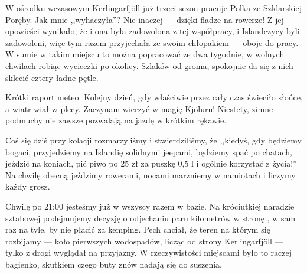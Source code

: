 W ośrodku wczasowym Kerlingarfjöll już trzeci sezon pracuje Polka ze Szklarskiej Poręby. Jak mnie ,,wyhaczyła''? Nie inaczej --- dzięki fladze na rowerze! Z jej opowieści wynikało, że i ona była zadowolona z tej współpracy, i Islandczycy byli zadowoleni, więc tym razem przyjechała ze swoim chłopakiem --- oboje do pracy. W sumie w takim miejscu to można popracować ze dwa tygodnie, w wolnych chwilach robiąc wycieczki po okolicy. Szlaków od groma, spokojnie da się z nich sklecić cztery ładne pętle.


Krótki raport meteo. Kolejny dzień, gdy właściwie przez cały czas świeciło słońce, a wiatr wiał w plecy. Zaczynam wierzyć w magię Kjöluru! Niestety, zimne podmuchy nie zawsze pozwalają na jazdę w krótkim rękawie.

Coś się dziś przy kolacji rozmarzyliśmy i stwierdziliśmy, że ,,kiedyś, gdy będziemy bogaci, przyjedziemy na Islandię solidnymi jeepami, będziemy spać po chatach, jeździć na koniach, pić piwo po 25 zł za puszkę 0,5 l i ogólnie korzystać z życia!'' Na chwilę obecną jeździmy rowerami, nocami marzniemy w namiotach i liczymy każdy grosz.

Chwilę po 21:00 jesteśmy już w wszyscy razem w bazie. Na króciutkiej naradzie sztabowej podejmujemy decyzję o odjechaniu paru kilometrów w stronę , w sam raz na tyle, by nie płacić za kemping. Pech chciał, że teren na którym się rozbijamy --- koło pierwszych wodospadów, licząc od strony Kerlingarfjöll --- tylko z drogi wyglądał na przyjazny. W rzeczywistości miejscami było to raczej bagienko, skutkiem czego buty znów nadają się do suszenia.

